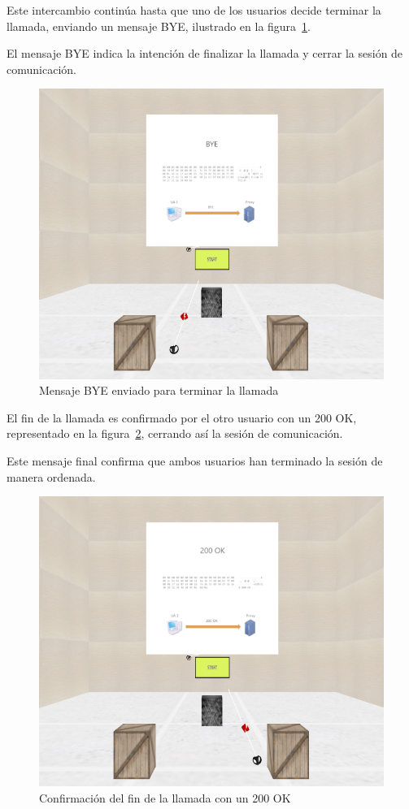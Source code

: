 \documentclass[a4paper, 12pt]{book}
\begin{document}
Este intercambio continúa hasta que uno de los usuarios decide terminar la llamada, 
enviando un mensaje BYE, ilustrado en la figura~\ref{fig:12-BYE}. 

El mensaje BYE indica la intención de finalizar la llamada y cerrar la sesión de comunicación.

\bigskip

\begin{figure}[H]
  \centering
  \includegraphics[width=12cm, keepaspectratio]{img/resultados/16-BYE.PNG}
  \caption{Mensaje BYE enviado para terminar la llamada}
  \label{fig:12-BYE}
\end{figure}
\clearpage

El fin de la llamada es confirmado por el otro usuario con un 200 OK, representado en la figura~\ref{fig:13-200OK_BYE}, 
cerrando así la sesión de comunicación. 

Este mensaje final confirma que ambos usuarios han terminado la sesión de manera ordenada.

\bigskip

\begin{figure}[H]
  \centering
  \includegraphics[width=12cm, keepaspectratio]{img/resultados/18-200OK.PNG}
  \caption{Confirmación del fin de la llamada con un 200 OK}
  \label{fig:13-200OK_BYE}
\end{figure}
\end{document}
